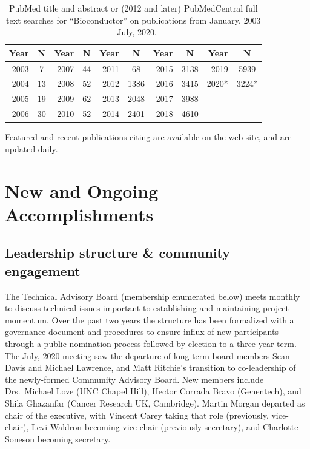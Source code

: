 \documentclass[letterpaper]{article}
\begin{document}
\begin{table}
  \caption{PubMed title and abstract or (2012 and later) PubMedCentral full text searches for ``Bioconductor'' on
    publications from January, 2003 -- July, 2020.}
  \label{table:pubMed}
  \begin{center}
    \begin{tabular}{rc|rc|rc|rc|rc}
      Year &  N & Year &  N & Year &    N & Year  & N    & Year  & N\\\hline\noalign{\smallskip}
      2003 &  7 & 2007 & 44 & 2011 &   68 & 2015  & 3138 & 2019  & 5939 \\
      2004 & 13 & 2008 & 52 & 2012 & 1386 & 2016  & 3415 & 2020* & 3224*\\
      2005 & 19 & 2009 & 62 & 2013 & 2048 & 2017  & 3988 & \\
      2006 & 30 & 2010 & 52 & 2014 & 2401 & 2018  & 4610 & \\
    \end{tabular}
  \end{center}
\end{table}

\href{https://bioconductor.org/help/publications/}{Featured and recent
  publications} citing \Bioconductor{} are available on the
\Bioconductor{} web site, and are updated daily. 

\section{New and Ongoing Accomplishments}

\subsection{Leadership structure \& community engagement}

The Technical Advisory Board (membership enumerated below) meets
monthly to discuss technical issues important to establishing and
maintaining project momentum. Over the past two years the structure
has been formalized with a governance document and procedures to
ensure influx of new participants through a public nomination process
followed by election to a three year term. The July, 2020 meeting saw
the departure of long-term board members Sean Davis and Michael
Lawrence, and Matt Ritchie's transition to co-leadership of the
newly-formed Community Advisory Board. New members include
Drs.\ Michael Love (UNC Chapel Hill), Hector Corrada Bravo
(Genentech), and Shila Ghazanfar (Cancer Research UK,
Cambridge). Martin Morgan departed as chair of the executive, with
Vincent Carey taking that role (previously, vice-chair), Levi Waldron
becoming vice-chair (previously secretary), and Charlotte Soneson
becoming secretary.
\end{document}
